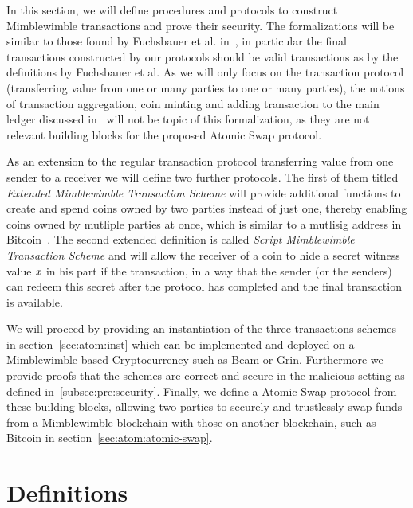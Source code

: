In this section, we will define procedures and protocols to construct Mimblewimble transactions and prove their security.
The formalizations will be similar to those found by Fuchsbauer et al. in~\cite{fuchsbauer2019aggregate}, in particular the final transactions constructed by our protocols should be valid transactions as by the definitions by Fuchsbauer et al.
As we will only focus on the transaction protocol (transferring value from one or many parties to one or many parties), the notions of transaction aggregation, coin minting and adding transaction to the main ledger discussed in~\cite{fuchsbauer2019aggregate} will not be topic of this formalization, as they are not relevant building blocks for the proposed Atomic Swap protocol.

As an extension to the regular transaction protocol transferring value from one sender to a receiver we will define two further protocols.
The first of them titled \emph{Extended Mimblewimble Transaction Scheme} will provide additional functions to create and spend coins owned by two parties instead of just one, thereby enabling coins owned by mutliple parties at once, which is similar to a mutlisig address in Bitcoin~\cite{antonopoulos2014mastering}.
The second extended definition is called \emph{Script Mimblewimble Transaction Scheme} and will allow the receiver
of a coin to hide a secret witness value $\mathit{x}$ in his part if the transaction, in a way that the sender (or the senders) can redeem this secret after the protocol has completed and the final transaction is available.

We will proceed by providing an instantiation of the three transactions schemes in section~\ref{sec:atom:inst} which can be implemented and deployed on a Mimblewimble based Cryptocurrency such as Beam or Grin.
Furthermore we provide proofs that the schemes are correct and secure in the malicious setting as defined in~\ref{subsec:pre:security}.
Finally, we define a Atomic Swap protocol from these building blocks, allowing two parties to securely and trustlessly swap funds from a Mimblewimble blockchain with those on another blockchain, such as Bitcoin in section~\ref{sec:atom:atomic-swap}.

\section{Definitions}\label{sec:atom:definitions}



